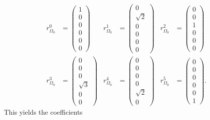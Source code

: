 \documentclass{scrartcl}
\begin{document}
\begin{align}
  r_{\Omega_0}^0&=\begin{pmatrix} 1 \\ 0 \\ 0 \\ 0 \\ 0 \\ 0 \end{pmatrix} &
  r_{\Omega_0}^1&=\begin{pmatrix} 0 \\ \sqrt2 \\ 0 \\ 0 \\ 0 \\ 0 \end{pmatrix} &
  r_{\Omega_0}^2&=\begin{pmatrix} 0 \\ 0 \\ 1 \\ 0 \\ 0 \\ 0 \end{pmatrix} \\
  r_{\Omega_0}^3&=\begin{pmatrix} 0 \\ 0 \\ 0 \\ \sqrt3 \\ 0 \\ 0 \end{pmatrix} &
  r_{\Omega_0}^4&=\begin{pmatrix} 0 \\ 0 \\ 0 \\ 0 \\ \sqrt2 \\ 0 \end{pmatrix} &
  r_{\Omega_0}^5&=\begin{pmatrix} 0 \\ 0 \\ 0 \\ 0 \\ 0 \\ 1 \end{pmatrix}.
\end{align}
This yields the coefficients
\end{document}
